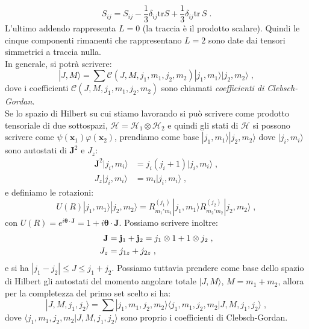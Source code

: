 \documentclass[10pt,a4paper]{report}
\theoremstyle{definition}
\newcommand{\ham}{\mathcal{H}}
\numberwithin{equation}{section}
\newcommand{\bra}{\langle}
\newcommand{\ket}{\rangle}
\newcommand{\tr}{\mathrm{tr}}
\begin{document}
\begin{equation}
S_{ij}=S_{ij}-\frac{1}{3}\delta_{ij}\tr S+\frac{1}{3}\delta_{ij}\tr\, S\;.
\end{equation}
L'ultimo addendo rappresenta $L=0$ (la traccia è il prodotto scalare). Quindi le cinque componenti rimanenti che rappresentano $L=2$ sono date dai tensori simmetrici a traccia nulla. \\
In generale, si potrà scrivere:
\begin{equation}
|J,M\ket=\sum \mathcal{C}(J,M,j_1,m_1,j_2,m_2)|j_1,m_1\ket|j_2,m_2\ket\;,
\end{equation}
dove i coefficienti $\mathcal{C}(J,M,j_1,m_1,j_2,m_2)$ sono chiamati \textit{coefficienti di Clebsch-Gordan}. \\
Se lo spazio di Hilbert su cui stiamo lavorando si può scrivere come prodotto tensoriale di due sottospazi, $\ham=\ham_1 \otimes \ham_2$ e quindi gli stati di $\ham$ si possono scrivere come $\psi(\mathbf{x}_1)\varphi(\mathbf{x}_2)$, prendiamo come base $|j_1,m_1\ket|j_2,m_2\ket$ dove $|j_i,m_i\ket$ sono autostati di $\mathbf{J}^2$ e $J_z$:
\begin{align*}
\mathbf{J}^2|j_i,m_i\ket &= j_i(j_i+1)|j_i,m_i\ket\;, \\
J_z|j_i,m_i\ket&=m_i|j_i,m_i\ket\;,
\end{align*}
e definiamo le rotazioni:
\begin{equation}
U(R)|j_1,m_1\ket|j_2,m_2\ket=R^{(j_1)}_{m_1'm_1}|j_1,m_1\ket R^{(j_2)}_{m_2'm_2}|j_2,m_2\ket\;,
\end{equation}
con $U(R)=e^{i\boldsymbol{\theta}\cdot\mathbf{J}}=1+i\boldsymbol{\theta}\cdot\mathbf{J}$. Possiamo scrivere inoltre:
\begin{align}
\mathbf{J}&=\mathbf{j}_1+\mathbf{j}_2=j_1\otimes 1+ 1\otimes j_2 \notag\;, \\
J_z &= j_{1z}+j_{2z}\;,
\end{align}
e si ha $|j_1-j_2|\le J\le j_1+j_2$. Possiamo tuttavia prendere come base dello spazio di Hilbert gli autostati del momento angolare totale $|J,M\ket$, $M=m_1+m_2$, allora per la completezza del primo set scelto si ha:
\begin{equation}
|J,M,j_1,j_2\ket=\sum |j_1,m_1,j_2,m_2\ket\bra j_1,m_1,j_2,m_2|J,M,j_1,j_2\ket\;,
\end{equation}
dove $\bra j_1,m_1,j_2,m_2|J,M,j_1,j_2\ket$ sono proprio i coefficienti di Clebsch-Gordan.
\end{document}
